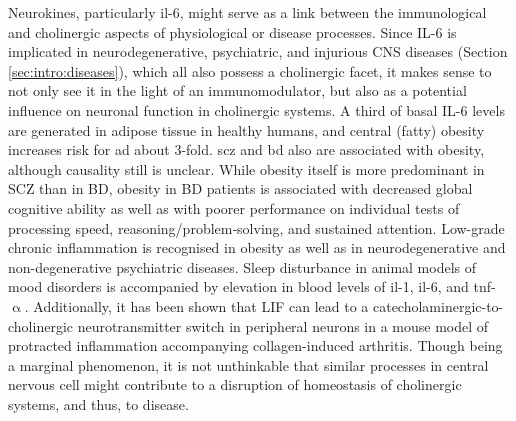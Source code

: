Neurokines, particularly \ac{il}-6, might serve as a link between the immunological and cholinergic aspects of physiological or disease processes. Since IL-6 is implicated in neurodegenerative, psychiatric, and injurious CNS diseases (Section \ref{sec:intro:diseases}), which all also possess a cholinergic facet, it makes sense to not only see it in the light of an immunomodulator, but also as a potential influence on neuronal function in cholinergic systems. A third of basal IL-6 levels are generated in adipose tissue in healthy humans,\cite{Mohamed-Ali1997} and central (fatty) obesity increases risk for \ac{ad} about 3-fold.\cite{Gustafson2004, Profenno2010} \Ac{scz} and \ac{bd} also are associated with obesity, although causality still is unclear. While obesity itself is more predominant in SCZ than in BD, obesity in BD patients is associated with decreased global cognitive ability as well as with poorer performance on individual tests of processing speed, reasoning/problem‐solving, and sustained attention.\cite{Depp2014} Low-grade chronic inflammation is recognised in obesity\cite{Eder2009} as well as in neurodegenerative\cite{Heppner2015} and non-degenerative psychiatric diseases.\cite{Kirkpatrick2013, Takao2013} Sleep disturbance in animal models of mood disorders is accompanied by elevation in blood levels of \ac{il}-1, \ac{il}-6, and \ac{tnf}-$\upalpha$.\cite{Hodes2015} Additionally, it has been shown that LIF can lead to a catecholaminergic-to-cholinergic neurotransmitter switch in peripheral neurons in a mouse model of protracted inflammation accompanying collagen-induced arthritis.\cite{Stangl2015} Though being a marginal phenomenon, it is not unthinkable that similar processes in central nervous cell might contribute to a disruption of homeostasis of cholinergic systems, and thus, to disease.



